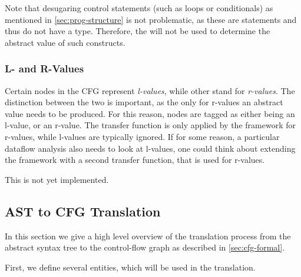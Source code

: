 Note that desugaring control statements (such as loops or conditionals) as mentioned
in \autoref{sec:prog-structure} is not problematic, as these are statements and thus do not
have a type.  Therefore, the  will not be used to determine
the abstract value of such constructs.




\subsubsection{L- and R-Values}

Certain nodes in the CFG represent \emph{l-values}, while other stand for \emph{r-values}.  The
distinction between the two is important, as the only for r-values an abstract value needs to be
produced.  For this reason, nodes are tagged as either being an l-value, or an r-value.  The transfer function
is only applied by the framework for r-values, while l-values are typically ignored.  If for some
reason, a particular dataflow analysis also needs to look at l-values, one could think about
extending the framework with a second transfer function, that is used for r-values.

\begin{workinprogress}
    This is not yet implemented.
\end{workinprogress}





\subsection{AST to CFG Translation}

In this section we give a high level overview of the translation process from the
abstract syntax tree to the control-flow graph as described in \autoref{sec:cfg-formal}.

First, we define several entities, which will be used in the translation.

